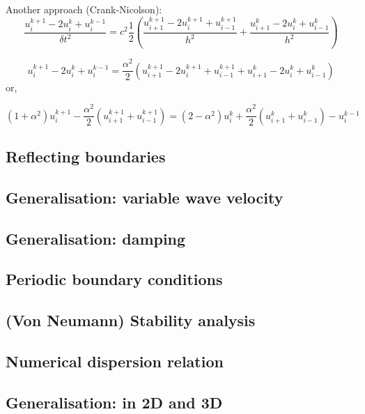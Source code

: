 Another approach (Crank-Nicolson):
\[
\frac{ u_i^{k+1} -2u_i^{k} +u_i^{k-1}  }{\delta\! t^2} = 
c^2 \frac12 \left(
\frac{ u_{i+1}^{k+1} -2u_{i}^{k+1} +u_{i-1}^{k+1}  }{h^2} 
+
\frac{ u_{i+1}^k -2u_{i}^k +u_{i-1}^k  }{h^2} 
\right)
\]


\[
u_i^{k+1} -2u_i^{k} +u_i^{k-1} 
=
\frac{\alpha^2}{2} \left(
u_{i+1}^{k+1} -2u_{i}^{k+1} +u_{i-1}^{k+1} 
+
u_{i+1}^k -2u_{i}^k +u_{i-1}^k 
\right)
\]
or,
\begin{mdframed}[backgroundcolor=blue!5]
\begin{equation}
(1+\alpha^2) u_i^{k+1} 
-\frac{\alpha^2}{2} (u_{i+1}^{k+1} +u_{i-1}^{k+1} )
=
(2-\alpha^2) u_i^{k} 
+\frac{\alpha^2}{2} (u_{i+1}^{k} +u_{i-1}^{k} )
-u_i^{k-1} 
\end{equation}
\end{mdframed}



\subsection{Reflecting boundaries}

\subsection{Generalisation: variable wave velocity}

\subsection{Generalisation: damping}

\subsection{Periodic boundary conditions}

\subsection{(Von Neumann) Stability analysis}

\subsection{Numerical dispersion relation}

\subsection{Generalisation: in 2D and 3D}








